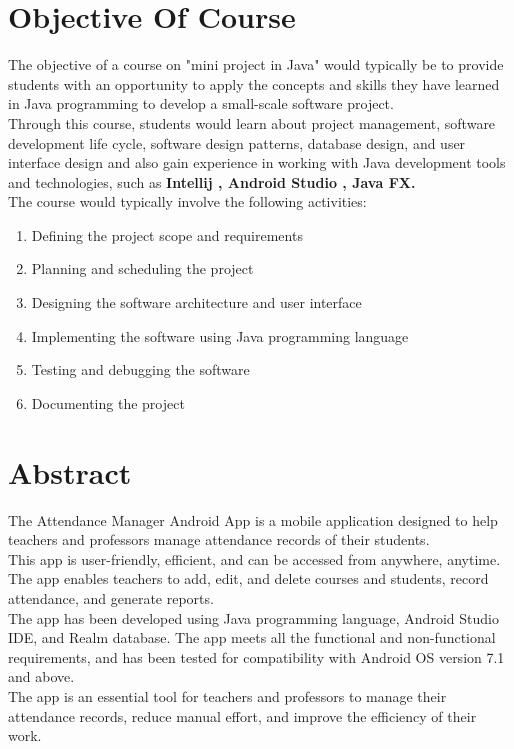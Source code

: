 \documentclass{article}
\begin{document}
\newpage
\doublespacing
\section {Objective Of Course}
{\fontsize{14}{14}\selectfont The objective of a course on "mini project in Java" would typically be to provide students with an opportunity to apply the concepts and skills they have learned in Java programming to develop a small-scale software project.\\
Through this course, students would learn about project management, software development life cycle, software design patterns, database design, and user interface design and also gain experience in working with Java development tools and technologies, such as \textbf{Intellij , Android Studio , Java FX.}
\\
The course would typically involve the following activities:
\begin{enumerate}
   \item Defining the project scope and requirements
  \item Planning and scheduling the project
  \item Designing the software architecture and user interface
  \item Implementing the software using Java programming language
  \item Testing and debugging the software
  \item Documenting the project
\end{enumerate}
}
\newpage
\doublespacing
\section{Abstract}
{\fontsize{14}{14}\selectfont The Attendance Manager Android App is a mobile application designed to help teachers and professors manage attendance records of their students. \\
This app is user-friendly, efficient, and can be accessed from anywhere, anytime. The app enables teachers to add, edit, and delete courses and students, record attendance, and generate reports. \\
The app has been developed using Java programming language, Android Studio IDE, and Realm database. The app meets all the functional and non-functional requirements, and has been tested for compatibility with Android OS version 7.1 and above. \\
The app is an essential tool for teachers and professors to manage their attendance records, reduce manual effort, and improve the efficiency of their work.}
\end{document}
